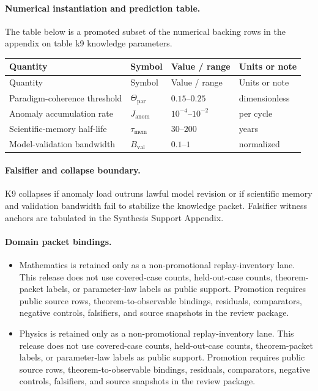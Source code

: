 \paragraph{Numerical instantiation and prediction table.}
The table below is a promoted subset of the numerical backing rows in the appendix on table k9 knowledge parameters.
\begin{longtable}{@{}L{0.27\textwidth}L{0.15\textwidth}L{0.24\textwidth}L{0.16\textwidth}@{}}
\toprule
Quantity & Symbol & Value / range & Units or note \\
\midrule
\endfirsthead
\toprule
Quantity & Symbol & Value / range & Units or note \\
\midrule
\endhead
Paradigm-coherence threshold & $\scriptstyle \Theta_{\mathrm{par}}$ & $0.15\text{--}0.25$ & dimensionless \\
Anomaly accumulation rate & $\scriptstyle J_{\mathrm{anom}}$ & $10^{-4}\text{--}10^{-2}$ & per cycle \\
Scientific-memory half-life & $\scriptstyle \tau_{\mathrm{mem}}$ & $30\text{--}200$ & years \\
Model-validation bandwidth & $\scriptstyle B_{\mathrm{val}}$ & $0.1\text{--}1$ & normalized \\
\bottomrule
\end{longtable}

\paragraph{Falsifier and collapse boundary.}
K9 collapses if anomaly load outruns lawful model revision or if scientific memory and validation bandwidth fail to stabilize the knowledge packet.
Falsifier witness anchors are tabulated in the Synthesis Support Appendix.

\paragraph{Domain packet bindings.}
\begin{itemize}[leftmargin=1.6em,nosep]
\item Mathematics is retained only as a non-promotional replay-inventory lane. This release does not use covered-case counts, held-out-case counts, theorem-packet labels, or parameter-law labels as public support. Promotion requires public source rows, theorem-to-observable bindings, residuals, comparators, negative controls, falsifiers, and source snapshots in the review package.
\item Physics is retained only as a non-promotional replay-inventory lane. This release does not use covered-case counts, held-out-case counts, theorem-packet labels, or parameter-law labels as public support. Promotion requires public source rows, theorem-to-observable bindings, residuals, comparators, negative controls, falsifiers, and source snapshots in the review package.
\end{itemize}

